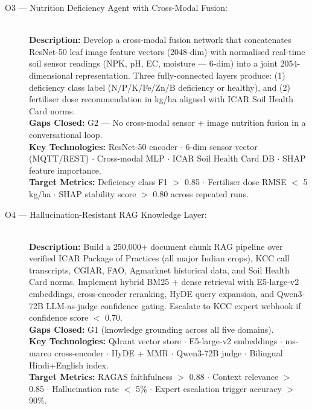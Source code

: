 \documentclass[12pt,a4paper]{article}
\begin{document}
\begin{description}
    \item[O3 --- Nutrition Deficiency Agent with Cross-Modal Fusion:] \hfill \\
    \textbf{Description:} Develop a cross-modal fusion network that concatenates ResNet-50 leaf image feature vectors (2048-dim) with normalised real-time soil sensor readings (NPK, pH, EC, moisture --- 6-dim) into a joint 2054-dimensional representation. Three fully-connected layers produce: (1) deficiency class label (N/P/K/Fe/Zn/B deficiency or healthy), and (2) fertiliser dose recommendation in kg/ha aligned with ICAR Soil Health Card norms. \\
    \textbf{Gaps Closed:} G2 --- No cross-modal sensor + image nutrition fusion in a conversational loop. \\
    \textbf{Key Technologies:} ResNet-50 encoder $\cdot$ 6-dim sensor vector (MQTT/REST) $\cdot$ Cross-modal MLP $\cdot$ ICAR Soil Health Card DB $\cdot$ SHAP feature importance. \\
    \textbf{Target Metrics:} Deficiency class F1 $>$ 0.85 $\cdot$ Fertiliser dose RMSE $<$ 5 kg/ha $\cdot$ SHAP stability score $>$ 0.80 across repeated runs.

    \item[O4 --- Hallucination-Resistant RAG Knowledge Layer:] \hfill \\
    \textbf{Description:} Build a 250,000+ document chunk RAG pipeline over verified ICAR Package of Practices (all major Indian crops), KCC call transcripts, CGIAR, FAO, Agmarknet historical data, and Soil Health Card norms. Implement hybrid BM25 + dense retrieval with E5-large-v2 embeddings, cross-encoder reranking, HyDE query expansion, and Qwen3-72B LLM-as-judge confidence gating. Escalate to KCC expert webhook if confidence score $<$ 0.70. \\
    \textbf{Gaps Closed:} G1 (knowledge grounding across all five domains). \\
    \textbf{Key Technologies:} Qdrant vector store $\cdot$ E5-large-v2 embeddings $\cdot$ ms-marco cross-encoder $\cdot$ HyDE + MMR $\cdot$ Qwen3-72B judge $\cdot$ Bilingual Hindi+English index. \\
    \textbf{Target Metrics:} RAGAS faithfulness $>$ 0.88 $\cdot$ Context relevance $>$ 0.85 $\cdot$ Hallucination rate $<$ 5\% $\cdot$ Expert escalation trigger accuracy $>$ 90\%.


\end{description}
\end{document}

